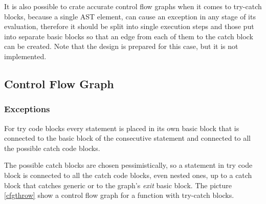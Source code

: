         It is also possible to crate accurate control flow 
        graphs when it comes to try-catch blocks, because a single AST element, 
        can cause an exception in any stage of its evaluation, therefore it should 
        be split into single execution steps and those put into separate 
        basic blocks so that an edge from each of them to the 
        catch block can be created. Note that the design is prepared 
        for this case, but it is not implemented.
    
    \subsection{Control Flow Graph}        
        
        \subsubsection*{Exceptions}
        For try code blocks every statement is placed in 
        its own basic block that is connected to the basic block 
        of the consecutive statement and connected to all 
        the possible catch code blocks.
        
        The possible catch blocks are chosen pessimistically, so 
        a statement in try code block is connected to all the 
        catch code blocks, even nested ones, up to a catch block 
        that catches generic  or to the 
        graph's \emph{exit} basic block. The picture \ref{cfgthrow} show 
        a control flow graph for a function with try-catch blocks.
        
